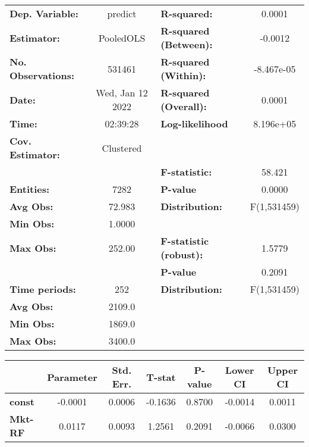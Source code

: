 \begin{center}
\begin{tabular}{lclc}
\toprule
\textbf{Dep. Variable:}    &      predict       & \textbf{  R-squared:         }   &      0.0001      \\
\textbf{Estimator:}        &     PooledOLS      & \textbf{  R-squared (Between):}  &     -0.0012      \\
\textbf{No. Observations:} &       531461       & \textbf{  R-squared (Within):}   &    -8.467e-05    \\
\textbf{Date:}             &  Wed, Jan 12 2022  & \textbf{  R-squared (Overall):}  &      0.0001      \\
\textbf{Time:}             &      02:39:28      & \textbf{  Log-likelihood     }   &    8.196e+05     \\
\textbf{Cov. Estimator:}   &     Clustered      & \textbf{                     }   &                  \\
\textbf{}                  &                    & \textbf{  F-statistic:       }   &      58.421      \\
\textbf{Entities:}         &        7282        & \textbf{  P-value            }   &      0.0000      \\
\textbf{Avg Obs:}          &       72.983       & \textbf{  Distribution:      }   &   F(1,531459)    \\
\textbf{Min Obs:}          &       1.0000       & \textbf{                     }   &                  \\
\textbf{Max Obs:}          &       252.00       & \textbf{  F-statistic (robust):} &      1.5779      \\
\textbf{}                  &                    & \textbf{  P-value            }   &      0.2091      \\
\textbf{Time periods:}     &        252         & \textbf{  Distribution:      }   &   F(1,531459)    \\
\textbf{Avg Obs:}          &       2109.0       & \textbf{                     }   &                  \\
\textbf{Min Obs:}          &       1869.0       & \textbf{                     }   &                  \\
\textbf{Max Obs:}          &       3400.0       & \textbf{                     }   &                  \\
\bottomrule
\end{tabular}
\begin{tabular}{lcccccc}
                & \textbf{Parameter} & \textbf{Std. Err.} & \textbf{T-stat} & \textbf{P-value} & \textbf{Lower CI} & \textbf{Upper CI}  \\
\midrule
\textbf{const}  &      -0.0001       &       0.0006       &     -0.1636     &      0.8700      &      -0.0014      &       0.0011       \\
\textbf{Mkt-RF} &       0.0117       &       0.0093       &      1.2561     &      0.2091      &      -0.0066      &       0.0300       \\
\bottomrule
\end{tabular}
\end{center}
